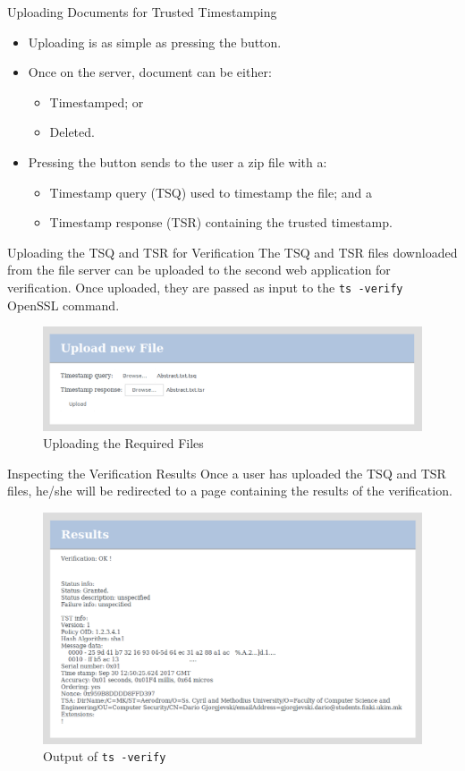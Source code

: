 \documentclass[xcolor={svgnames, table}, usepdftitle=false]{beamer}
\begin{document}
\begin{frame}{Uploading Documents for Trusted Timestamping}
  \begin{itemize}
  \item Uploading is as simple as pressing the 
    button.
  \item Once on the server, document can be either:
    \begin{itemize}
    \item Timestamped; or
    \item Deleted.
    \end{itemize}
  \item Pressing the  button sends to the user
    a zip file with a:
    \begin{itemize}
    \item Timestamp query (TSQ) used to timestamp the file; and a
    \item Timestamp response (TSR) containing the trusted timestamp.
    \end{itemize}
  \end{itemize}
\end{frame}

\begin{frame}{Uploading the TSQ and TSR for Verification}
  The TSQ and TSR files downloaded from the file server can be
  uploaded to the second web application for verification.  Once
  uploaded, they are passed as input to the \texttt{ts
    -verify} OpenSSL command.
  \begin{figure}[H]
    \includegraphics[width=.75\textwidth]{UploadTrustedTimestamp.png}
    \caption{Uploading the Required Files}
  \end{figure}
\end{frame}

\begin{frame}{Inspecting the Verification Results}
  Once a user has uploaded the TSQ and TSR files, he/she will be
  redirected to a page containing the results of the verification.
  \begin{figure}[H]
    \includegraphics[width=.75\textwidth]{VerificationResults.png}
    \caption{Output of \texttt{ts -verify}}
  \end{figure}
\end{frame}
\end{document}
